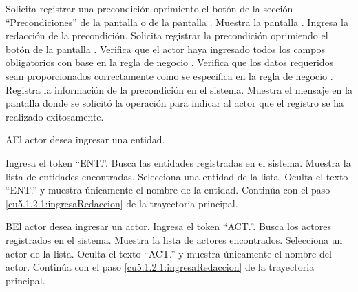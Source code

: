 
 \begin{UCtrayectoria}
	\UCpaso[\UCactor] Solicita registrar una precondición oprimiento el botón \btnAgregar de la sección ``Precondiciones'' de la pantalla  o de la pantalla . 
	\UCpaso[\UCsist] Muestra la pantalla . 
	\UCpaso[\UCactor] Ingresa la redacción de la precondición.         \label{cu5.1.2.1:ingresaRedaccion}
	\UCpaso[\UCactor] Solicita registrar la precondición oprimiendo el botón  de la pantalla .  
	\UCpaso[\UCsist] Verifica que el actor haya ingresado todos los campos obligatorios con base en la regla de negocio . 
	\UCpaso[\UCsist] Verifica que los datos requeridos sean proporcionados correctamente como se especifica en la regla de negocio .  
	\UCpaso[\UCsist] Registra la información de la precondición en el sistema.
	\UCpaso[\UCsist] Muestra el mensaje  en la pantalla donde se solicitó la operación
	para indicar al actor que el registro se ha realizado exitosamente. 
\end{UCtrayectoria}

    

 \begin{UCtrayectoriaA}{A}{El actor desea ingresar una entidad.}
 	
 	 \UCpaso[\UCactor] Ingresa el token ``ENT.''.
 	\UCpaso[\UCsist] Busca las entidades registradas en el sistema. 
 	\UCpaso[\UCsist] Muestra la lista de entidades encontradas.
 	\UCpaso[\UCactor] Selecciona una entidad de la lista.
  	\UCpaso[\UCsist] Oculta el texto ``ENT.'' y muestra únicamente el nombre de la entidad.
    \UCpaso[] Continúa con el paso \ref{cu5.1.2.1:ingresaRedaccion} de la trayectoria principal.
 \end{UCtrayectoriaA}
 
 \begin{UCtrayectoriaA}{B}{El actor desea ingresar un actor.}
 	\UCpaso[\UCactor] Ingresa el token ``ACT.''.
 	\UCpaso[\UCsist] Busca los actores registrados en el sistema. 
 	\UCpaso[\UCsist] Muestra la lista de actores encontrados.
 	\UCpaso[\UCactor] Selecciona un actor de la lista.
  	\UCpaso[\UCsist] Oculta el texto ``ACT.'' y muestra únicamente el nombre del actor.
    \UCpaso[] Continúa con el paso \ref{cu5.1.2.1:ingresaRedaccion} de la trayectoria principal.
 \end{UCtrayectoriaA}


